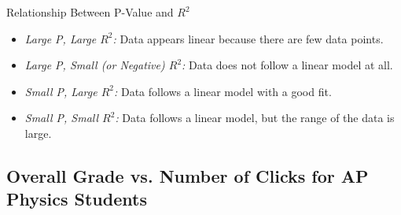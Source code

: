 \documentclass[xcolor=x11names,compress]{beamer}
\begin{document}
\begin{frame}{Relationship Between P-Value and $R^2$}
	\begin{itemize}
		\item \textit{Large P, Large $R^2$:}\newline
		Data appears linear because there are few data points.
		\vspace{2mm}
		\item \textit{Large P, Small (or Negative) $R^2$:}\newline
		Data does not follow a linear model at all.
		\vspace{2mm}
		\item \textit{Small P, Large $R^2$:}\newline
		Data follows a linear model with a good fit.
		\vspace{2mm}
		\item \textit{Small P, Small $R^2$:}\newline
		Data follows a linear model, but the range of the data is large.
	\end{itemize}
\end{frame}

\subsection{Overall Grade vs. Number of Clicks for AP Physics Students}
\end{document}
